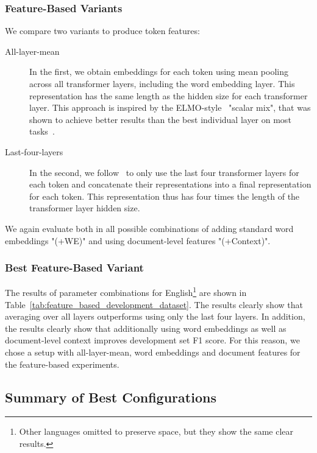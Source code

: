 \documentclass[11pt,a4paper]{article}
\begin{document}
\subsubsection{Feature-Based Variants}



We compare two variants to produce token features:
\begin{description}
\item[All-layer-mean] In the first, we obtain embeddings for each token using mean pooling across all transformer layers, including the word embedding layer. This representation has the same length as the hidden size for each transformer layer. This approach is inspired by the ELMO-style~\cite{peters-etal-2018-deep} "scalar mix", that was shown to achieve better results than the best individual layer on most tasks~\cite{liu-etal-2019-linguistic,DBLP:conf/iclr/TenneyXCWPMKDBD19}.
\item[Last-four-layers] In the second, we follow~\citet{devlin-etal-2019-bert} to only use the last four transformer layers for each token and concatenate their representations into a final representation for each token. This representation thus has four times the length of the transformer layer hidden size.
\end{description}
We again evaluate both in all possible combinations of adding standard word embeddings "(+WE)" and using document-level features "(+Context)".


\subsubsection{Best Feature-Based Variant}


The results of parameter combinations for English\footnote{Other languages omitted to preserve space, but they show the same clear results.} are shown in Table~\ref{tab:feature_based_development_dataset}. The results clearly show that averaging over all layers outperforms using only the last four layers. In addition, the results clearly show that additionally using word embeddings as well as document-level context improves development set F1 score. For this reason, we chose a setup with all-layer-mean, word embeddings and document features for the feature-based experiments. 

\subsection{Summary of Best Configurations}
\end{document}
